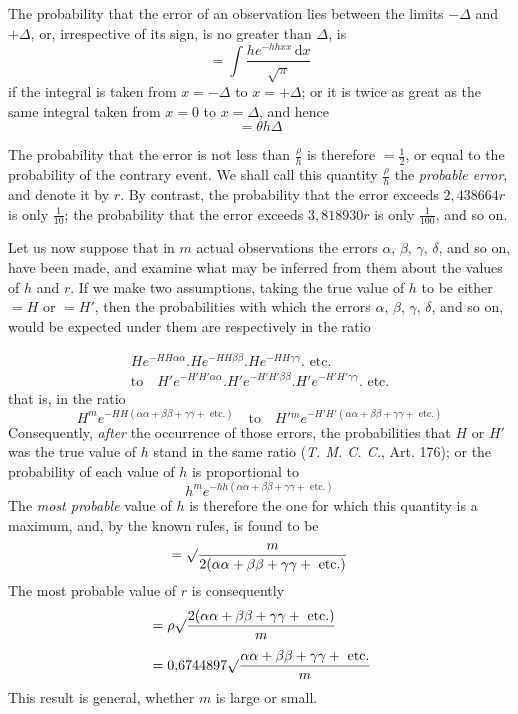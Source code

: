 The probability that the error of an observation lies between the limits \(-\Delta\) and \(+\Delta\), or, irrespective of its sign, is no greater than \(\Delta\), is
\[
=\int\frac{he^{-hhxx}\,\mathrm{d}x}{\surd\pi}
\]
if the integral is taken from \(x=-\Delta\) to \(x=+\Delta\); or it is twice as great as the same integral taken from \(x=0\) to \(x=\Delta\), and hence
\[
=\theta h\Delta
\]

The probability that the error is not less than \(\frac\rho h\) is therefore \(=\frac12\), or equal to the probability of the contrary event. We shall call this quantity \(\frac\rho h\) the \textit{probable error}, and denote it by \(r\). By contrast, the probability that the error exceeds \(2{,}438664r\) is only \(\frac1{10}\); the probability that the error exceeds \(3{,}818930r\) is only \(\frac1{100}\), and so on.

Let us now suppose that in \(m\) actual observations the errors \(\alpha,\,\beta,\,\gamma,\,\delta\), and so on, have been made, and examine what may be inferred from them about the values of \(h\) and \(r\). If we make two %
assumptions, taking the true value of \(h\) to be either \(=H\) or \(=H'\), then the probabilities with which the errors \(\alpha,\,\beta,\,\gamma,\,\delta\), and so on, would be expected under them are respectively in the ratio

\[
\begin{gathered}
He^{-HH\alpha\alpha}.He^{-HH\beta\beta}.He^{-HH\gamma\gamma}.\text{ etc.}\\
\text{to}\quad H'e^{-H'H'\alpha\alpha}.H'e^{-H'H'\beta\beta}.H'e^{-H'H'\gamma\gamma}.\text{ etc.}
\end{gathered}
\]
that is, in the ratio
\[
H^m e^{-HH(\alpha\alpha+\beta\beta+\gamma\gamma+\text{ etc.})}\quad\text{to}\quad
H'{}^m e^{-H'H'(\alpha\alpha+\beta\beta+\gamma\gamma+\text{ etc.})}
\]
Consequently, \textit{after} the occurrence of those errors, the probabilities that \(H\) or \(H'\) was the true value of \(h\) stand in the same ratio (\textit{T. M. C. C.}, Art. 176); or the probability of each value of \(h\) is proportional to
\[
h^m e^{-hh(\alpha\alpha+\beta\beta+\gamma\gamma+\text{ etc.})}
\]
The \textit{most probable} value of \(h\) is therefore the one for which this quantity is a maximum, and, by the known rules, is found to be
\[
=\surd\frac{m}{2(\alpha\alpha+\beta\beta+\gamma\gamma+\text{ etc.})}
\]
The most probable value of \(r\) is consequently
\[
\begin{aligned}
&=\rho\surd\frac{2(\alpha\alpha+\beta\beta+\gamma\gamma+\text{ etc.})}{m}\\[4pt]
&=0{,}6744897\surd\frac{\alpha\alpha+\beta\beta+\gamma\gamma+\text{ etc.}}{m}
\end{aligned}
\]
This result is general, whether \(m\) is large or small.

